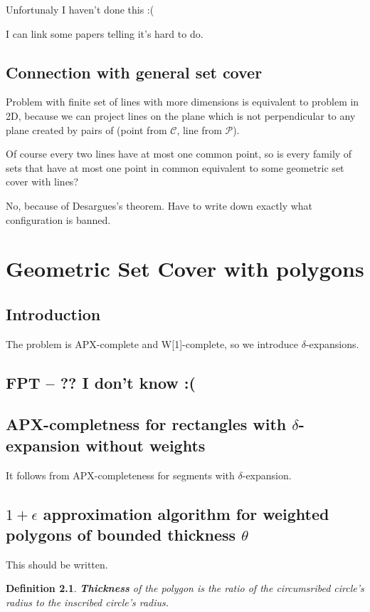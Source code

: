 \documentclass[en]{pracamgr}
\newtheorem{defi}{Definition}[section]
\begin{document}
Unfortunaly I haven't done this :(

I can link some papers telling it's hard to do.

\section{Connection with general set cover}
Problem with finite set of lines with more dimensions
is equivalent
to problem in 2D, because we can project
lines on the plane which is not perpendicular
to any plane created by pairs of
(point from $\mathcal{C}$, line from $\mathcal{P}$).

Of course every two lines have at most one common point,
so is every family of sets that have at most one point
in common equivalent to some geometric set cover with lines?

No, because of Desargues's theorem.
Have to write down exactly what configuration is banned.


\chapter{Geometric Set Cover with polygons}
\section{Introduction}
The problem is APX-complete and W[1]-complete,
so we introduce $\delta$-expansions.

\section{FPT -- ?? I don't know :(}

\section{APX-completness for rectangles with $\delta$-expansion without weights}
It follows from APX-completeness for segments with $\delta$-expansion.
\section{$1+\epsilon$ approximation algorithm for weighted polygons of bounded thickness $\theta$}
This should be written.

\begin{defi}
  \textbf{Thickness} of the polygon
  is the ratio of the circumsribed circle's
  radius to the inscribed circle's radius.
\end{defi}
\end{document}
